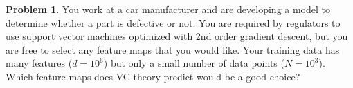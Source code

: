 \documentclass[10pt]{exam}
\theoremstyle{definition}
\newtheorem{problem}{Problem}
\begin{document}
\newpage
\begin{problem}
    You work at a car manufacturer and are developing a model to determine whether a part is defective or not.
    You are required by regulators to use support vector machines optimized with 2nd order gradient descent,
    but you are free to select any feature maps that you would like.
    Your training data has many features ($d=10^6$) but only a small number of data points ($N=10^3$).
    Which feature maps does VC theory predict would be a good choice?
\end{problem}
\begin{solution}
\end{solution}
\end{document}
